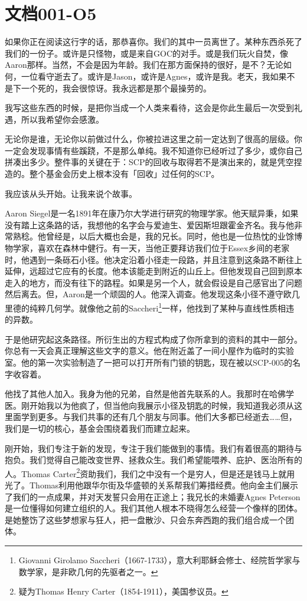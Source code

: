 \chapter{文档001-O5}

\label{chap:DOC-001-05}

如果你正在阅读这行字的话，那恭喜你。我们的其中一员离世了。某种东西杀死了我们的一份子。或许是只怪物，或是来自GOC的对手。或是我们玩火自焚，像Aaron那样。当然，不会是因为年龄。我们在那方面保持的很好，是不？无论如何，一位看守逝去了。或许是Jason，或许是Agnes，或许是我。老天，我如果不是下一个死的，我会很惊讶。我永远都是那个最操劳的。

我写这些东西的时候，是把你当成一个人类来看待，这会是你此生最后一次受到礼遇，所以我希望你会感激。

无论你是谁，无论你以前做过什么，你被拉进这里之前一定达到了很高的层级。你一定会发现事情有些蹊跷，不是那么单纯。我不知道你已经听过了多少，或你自己拼凑出多少。整件事的关键在于：SCP的回收与取得若不是演出来的，就是凭空捏造的。整个基金会历史上根本没有「回收」过任何的SCP。

我应该从头开始。让我来说个故事。

Aaron Siegel是一名1891年在康乃尔大学进行研究的物理学家。他天赋异秉，如果没有踏上这条路的话，我想他的名字会与爱迪生、爱因斯坦跟霍金齐名。我与他非常熟稔。他曾经是，以后大概也会是，我的兄长。同时，他也是一位热忱的业馀博物学家，喜欢在森林中健行。有一天，当他正要拜访我们位于Essex乡间的老家时，他遇到一条砾石小径。他决定沿着小径走一段路，并且注意到这条路不断往上延伸，远超过它应有的长度。他本该能走到附近的山丘上。但他发现自己回到原本走入的地方，而没有往下的路程。如果是另一个人，就会假设是自己感官出了问题然后离去。但，Aaron是一个顽固的人。他深入调查。他发现这条小径不遵守欧几里德的纯粹几何学。就像他之前的Saccheri\footnote{Giovanni Girolamo Saccheri（1667-1733），意大利耶稣会修士、经院哲学家与数学家，是非欧几何的先驱者之一。}一样，他找到了某种与直线性质相违的异数。

于是他研究起这条路径。所衍生出的方程式构成了你所拿到的资料的其中一部分。你总有一天会真正理解这些文字的意义。他在附近盖了一间小屋作为临时的实验室。他的第一次实验制造了一把可以打开所有门锁的钥匙，现在被以SCP-005的名字收容着。

他找了其他人加入。我身为他的兄弟，自然是他首先联系的人。我那时在哈佛学医。刚开始我以为他疯了，但当他向我展示小径及钥匙的时候，我知道我必须从这里面学到更多。与我们共事的还有几个朋友与同事。他们大多都已经逝去……但，我们是一切的核心，基金会围绕着我们而建立起来。

刚开始，我们专注于新的发现，专注于我们能做到的事情。我们有着很高的期待与抱负。我们觉得自己能改变世界、拯救众生。我们希望能喂养、庇护、医治所有的人。Thomas Carter\footnote{疑为Thomas Henry Carter（1854-1911），美国参议员。}资助我们，我们之中没有一个是穷人，但是还是钱马上就用光了。Thomas利用他跟华尔街及华盛顿的关系帮我们筹措经费。他向金主们展示了我们的一点成果，并对天发誓只会用在正途上；我兄长的未婚妻Agnes Peterson是一位懂得如何建立组织的人。我们其他人根本不晓得怎么经营一个像样的团体。是她整饬了这些梦想家与狂人，把一盘散沙、只会东奔西跑的我们组合成一个团体。


